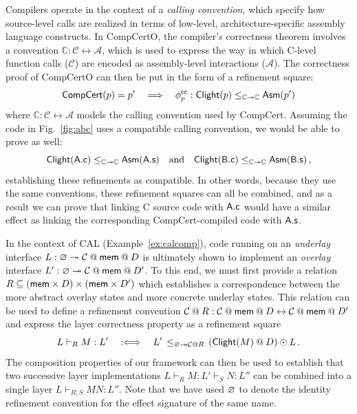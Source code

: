 \begin{example} %
\label{ex:bq-proof}
Compilers operate in the context of a \emph{calling convention},
which specify how source-level calls are realized
in terms of low-level, architecture-specific assembly language constructs.
In CompCertO,
the compiler's correctness theorem involves
a convention
$\mathbb{C} : \mathcal{C} \leftrightarrow \mathcal{A}$,
which is used to express the way in which
C-level function calls ($\mathcal{C}$) are encoded
as assembly-level interactions ($\mathcal{A}$).
The correctness proof of CompCertO
can then be put in the form of a refinement square:
\[
   \mathsf{CompCert} (p) = p'
  \quad \Longrightarrow \quad
    \phi^{ \mathsf{cc} }_p :
       \mathsf{Clight} (p) \le_{\mathbb{C} \twoheadrightarrow \mathbb{C}}  \mathsf{Asm} (p')
\]
where %
$\mathbb{C} : \mathcal{C} \leftrightarrow \mathcal{A}$
models the calling convention used by CompCert.
Assuming the code in Fig.~\ref{fig:abc} uses a compatible calling convention,
we would be able to prove as well:
\[
   \mathsf{Clight} ( \mathsf{A.c} ) \le_{\mathbb{C} \twoheadrightarrow \mathbb{C}}  \mathsf{Asm} ( \mathsf{A.s} )
  \quad \text{and} \quad
   \mathsf{Clight} ( \mathsf{B.c} ) \le_{\mathbb{C} \twoheadrightarrow \mathbb{C}}  \mathsf{Asm} ( \mathsf{B.s} )
  \,,
\]
establishing these refinements as compatible.
In other words,
because they use the same conventions,
these refinement squares can all be combined,
and as a result we can prove that
linking C source code with $ \mathsf{A.c} $
would have a similar effect as linking the corresponding CompCert-compiled code with $ \mathsf{A.s} $.
\end{example}

\begin{example} %
In the context of CAL (Example~\ref{ex:calcomp}),
code running on an \emph{underlay} interface
$L : \emptysig \twoheadrightarrow \mathcal{C} \mathbin@ \kw{mem} \mathbin@ D$
is ultimately shown to implement an \emph{overlay} interface
$L' : \emptysig \twoheadrightarrow \mathcal{C} \mathbin@ \kw{mem} \mathbin@ D'$.
To this end, we must first provide a relation
$R \subseteq ( \mathsf{mem}  \times D) \times ( \mathsf{mem}  \times D')$
which establishes a correspondence between
the more abstract overlay states and more concrete underlay states.
This relation can be used to define a refinement convention
$\mathcal{C} \mathbin@ R : \mathcal{C} \mathbin@ \kw{mem} \mathbin@ D
 \leftrightarrow \mathcal{C} \mathbin@ \kw{mem} \mathbin@ D'$
and express the layer correctness property as a refinement square
\[
  L \vdash_R M : L' \quad :\Longleftrightarrow \quad
  L' \, \le_{\emptysig \twoheadrightarrow \mathcal{C} \mathbin@ R} \,
    (\kw{Clight}(M) \mathbin@ D) \odot L
  \,.
\]
The composition properties of our framework can then be used to establish that
two successive layer implementations
$L \vdash_R M : L' \vdash_S N : L''$ can be combined into a single layer
$L \vdash_{R \mathbin; S} M N : L''$.
Note that we have used $\varnothing$ to denote the identity refinement convention
for the effect signature of the same name. 
\end{example}

